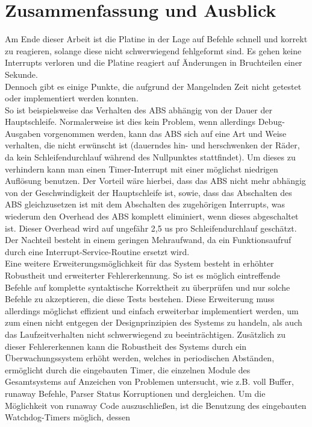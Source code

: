 \chapter{Zusammenfassung und Ausblick}
Am Ende dieser Arbeit ist die Platine in der Lage auf Befehle schnell und korrekt zu reagieren,
solange diese nicht schwerwiegend fehlgeformt sind. Es gehen keine Interrupts verloren und die
Platine reagiert auf Änderungen in Bruchteilen einer Sekunde.\\
Dennoch gibt es einige Punkte, die aufgrund der Mangelnden Zeit nicht getestet oder implementiert
werden konnten.\\
So ist beispielsweise das Verhalten des ABS abhängig von der Dauer der Hauptschleife. Normalerweise
ist dies kein Problem, wenn allerdings Debug-Ausgaben vorgenommen werden, kann das ABS sich
auf eine Art und Weise verhalten, die nicht erwünscht ist (dauerndes hin- und herschwenken der Räder,
da kein Schleifendurchlauf während des Nullpunktes stattfindet). Um dieses zu verhindern kann man
einen Timer-Interrupt mit einer möglichst niedrigen Auflösung benutzen. Der Vorteil wäre hierbei,
dass das ABS nicht mehr abhängig von der Geschwindigkeit der Hauptschleife ist, sowie, dass das
Abschalten des ABS gleichzusetzen ist mit dem Abschalten des zugehörigen Interrupts, was wiederum
den Overhead des ABS komplett eliminiert, wenn dieses abgeschaltet ist. Dieser Overhead wird auf
ungefähr 2,5 us pro Schleifendurchlauf geschätzt. Der Nachteil besteht in einem geringen
Mehraufwand, da ein Funktionsaufruf durch eine Interrupt-Service-Routine ersetzt wird.\\
Eine weitere Erweiterungsmöglichkeit für das System besteht in erhöhter Robustheit und erweiterter
Fehlererkennung. So ist es möglich eintreffende Befehle auf komplette syntaktische Korrektheit
zu überprüfen und nur solche Befehle zu akzeptieren, die diese Tests bestehen. Diese Erweiterung
muss allerdings möglichst effizient und einfach erweiterbar implementiert werden, um zum einen nicht
entgegen der Designprinzipien des Systems zu handeln, als auch das Laufzeitverhalten nicht
schwerwiegend zu beeinträchtigen. Zusätzlich zu dieser Fehlererkennen kann die Robustheit des Systems
durch ein Überwachungssystem erhöht werden, welches in periodischen Abständen, ermöglicht durch
die eingebauten Timer, die einzelnen Module des Gesamtsystems auf Anzeichen von Problemen untersucht,
wie z.B. voll Buffer, runaway Befehle, Parser Status Korruptionen und dergleichen. Um die Möglichkeit
von runaway Code auszuschließen, ist die Benutzung des eingebauten Watchdog-Timers möglich, dessen
